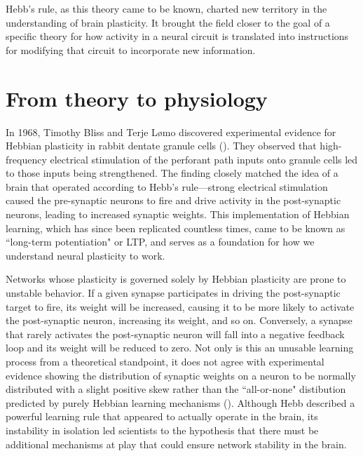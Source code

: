Hebb's rule, as this theory came to be known, charted new territory in the understanding of brain plasticity. It brought the field closer to the goal of a specific theory for how activity in a neural circuit is translated into instructions for modifying that circuit to incorporate new information.

\section{From theory to physiology}

In 1968, Timothy Bliss and Terje L\o mo discovered experimental evidence for Hebbian plasticity in rabbit dentate granule cells (\cite{Bliss1973}). They observed that high-frequency electrical stimulation of the perforant path inputs onto granule cells led to those inputs being strengthened. The finding closely matched the idea of a brain that operated according to Hebb's rule---strong electrical stimulation caused the pre-synaptic neurons to fire and drive activity in the post-synaptic neurons, leading to increased synaptic weights. This implementation of Hebbian learning, which has since been replicated countless times, came to be known as ``long-term potentiation" or LTP, and serves as a foundation for how we understand neural plasticity to work.

Networks whose plasticity is governed solely by Hebbian plasticity are prone to unstable behavior. If a given synapse participates in driving the post-synaptic target to fire, its weight will be increased, causing it to be more likely to activate the post-synaptic neuron, increasing its weight, and so on. Conversely, a synapse that rarely activates the post-synaptic neuron will fall into a negative feedback loop and its weight will be reduced to zero. Not only is this an unusable learning process from a theoretical standpoint, it does not agree with experimental evidence showing the distribution of synaptic weights on a neuron to be normally distributed with a slight positive skew rather than the ``all-or-none" distibution predicted by purely Hebbian learning mechanisms (\cite{Turrigiano1998}). Although Hebb described a powerful learning rule that appeared to actually operate in the brain, its instability in isolation led scientists to the hypothesis that there must be additional mechanisms at play that could ensure network stability in the brain.

